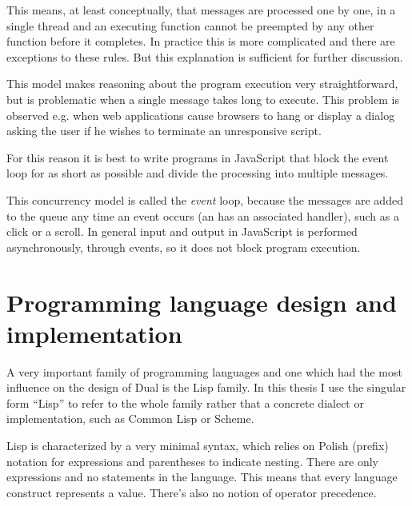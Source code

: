 This means, at least conceptually, that messages are processed one by one, in a single thread and an executing function cannot be preempted by any other function before it completes. In practice this is more complicated and there are exceptions to these rules. But this explanation is sufficient for further discussion.

This model makes reasoning about the program execution very straightforward, but
is problematic when a single message takes long to execute. This problem is
observed e.g. when web applications cause browsers to hang or display a
dialog asking the user if he wishes to terminate an unresponsive script.

For this reason it is best to write programs in JavaScript that block the event
loop for as short as possible and divide the processing into multiple messages.

This concurrency model is called the \textit{event} loop, because the messages are added to the queue any time an event occurs (an has an associated handler), such as a click or a scroll. In general input and output in JavaScript is performed asynchronously, through events, so it does not block program execution.

\section{Programming language design and implementation}
A very important family of programming languages and one which had the most
influence on the design of Dual is the Lisp family. In this thesis I use the
singular form ``Lisp'' to refer to the whole family rather that a concrete
dialect or implementation, such as Common Lisp or Scheme.

Lisp is characterized by a very minimal syntax, which relies on Polish (prefix)
notation for expressions and parentheses to indicate nesting. There are only
expressions and no statements in the language. This means that every language
construct represents a value. There's also no notion of operator precedence.


